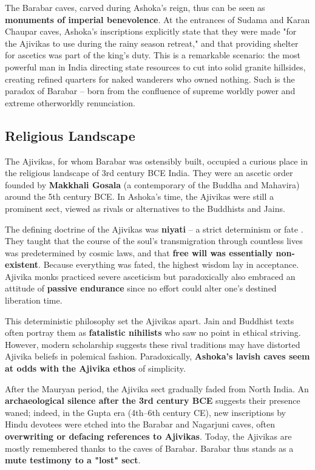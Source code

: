 \documentclass[11pt]{article}
\begin{document}
The Barabar caves, carved during Ashoka's reign, thus can be seen as \textbf{monuments of imperial benevolence}. At the entrances of Sudama and Karan Chaupar caves, Ashoka's inscriptions explicitly state that they were made "for the Ajivikas to use during the rainy season retreat," and that providing shelter for ascetics was part of the king's duty. This is a remarkable scenario: the most powerful man in India directing state resources to cut into solid granite hillsides, creating refined quarters for naked wanderers who owned nothing. Such is the paradox of Barabar -- born from the confluence of supreme worldly power and extreme otherworldly renunciation.

\subsection{Religious Landscape}

The Ajivikas, for whom Barabar was ostensibly built, occupied a curious place in the religious landscape of 3rd century BCE India. They were an ascetic order founded by \textbf{Makkhali Gosala} (a contemporary of the Buddha and Mahavira) around the 5th century BCE. In Ashoka's time, the Ajivikas were still a prominent sect, viewed as rivals or alternatives to the Buddhists and Jains.

The defining doctrine of the Ajivikas was \textbf{niyati} -- a strict determinism or fate \cite{Basham1951}. They taught that the course of the soul's transmigration through countless lives was predetermined by cosmic laws, and that \textbf{free will was essentially non-existent}. Because everything was fated, the highest wisdom lay in acceptance. Ajivika monks practiced severe asceticism but paradoxically also embraced an attitude of \textbf{passive endurance} since no effort could alter one's destined liberation time.

This deterministic philosophy set the Ajivikas apart. Jain and Buddhist texts often portray them as \textbf{fatalistic nihilists} who saw no point in ethical striving. However, modern scholarship suggests these rival traditions may have distorted Ajivika beliefs in polemical fashion. Paradoxically, \textbf{Ashoka's lavish caves seem at odds with the Ajivika ethos} of simplicity.

After the Mauryan period, the Ajivika sect gradually faded from North India. An \textbf{archaeological silence after the 3rd century BCE} suggests their presence waned; indeed, in the Gupta era (4th--6th century CE), new inscriptions by Hindu devotees were etched into the Barabar and Nagarjuni caves, often \textbf{overwriting or defacing references to Ajivikas}. Today, the Ajivikas are mostly remembered thanks to the caves of Barabar. Barabar thus stands as a \textbf{mute testimony to a "lost" sect}.
\end{document}
